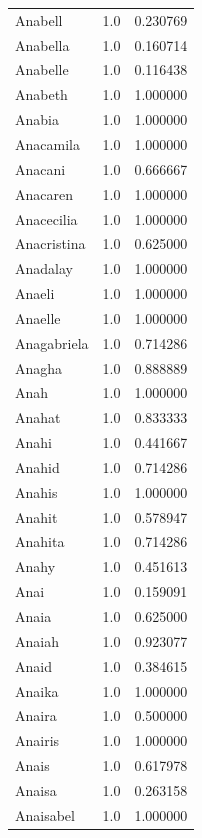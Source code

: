 \documentclass[
  letterpaper,
  DIV=11,
  numbers=noendperiod]{scrreprt}
\begin{document}
\begin{tabular}{lrr}
Anabell         &   1.0 &   0.230769 \\
Anabella        &   1.0 &   0.160714 \\
Anabelle        &   1.0 &   0.116438 \\
Anabeth         &   1.0 &   1.000000 \\
Anabia          &   1.0 &   1.000000 \\
Anacamila       &   1.0 &   1.000000 \\
Anacani         &   1.0 &   0.666667 \\
Anacaren        &   1.0 &   1.000000 \\
Anacecilia      &   1.0 &   1.000000 \\
Anacristina     &   1.0 &   0.625000 \\
Anadalay        &   1.0 &   1.000000 \\
Anaeli          &   1.0 &   1.000000 \\
Anaelle         &   1.0 &   1.000000 \\
Anagabriela     &   1.0 &   0.714286 \\
Anagha          &   1.0 &   0.888889 \\
Anah            &   1.0 &   1.000000 \\
Anahat          &   1.0 &   0.833333 \\
Anahi           &   1.0 &   0.441667 \\
Anahid          &   1.0 &   0.714286 \\
Anahis          &   1.0 &   1.000000 \\
Anahit          &   1.0 &   0.578947 \\
Anahita         &   1.0 &   0.714286 \\
Anahy           &   1.0 &   0.451613 \\
Anai            &   1.0 &   0.159091 \\
Anaia           &   1.0 &   0.625000 \\
Anaiah          &   1.0 &   0.923077 \\
Anaid           &   1.0 &   0.384615 \\
Anaika          &   1.0 &   1.000000 \\
Anaira          &   1.0 &   0.500000 \\
Anairis         &   1.0 &   1.000000 \\
Anais           &   1.0 &   0.617978 \\
Anaisa          &   1.0 &   0.263158 \\
Anaisabel       &   1.0 &   1.000000 \\

\end{tabular}
\end{document}
